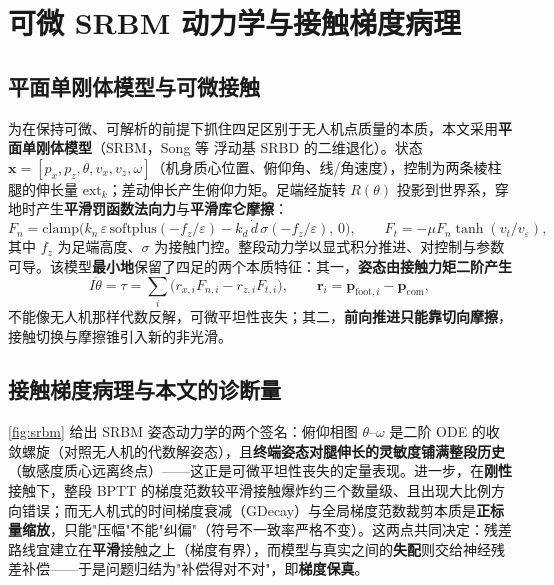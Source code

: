 \documentclass[zihao=5, a4paper]{ctexart}
\begin{document}
\section{可微 SRBM 动力学与接触梯度病理}

\subsection{平面单刚体模型与可微接触}

为在保持可微、可解析的前提下抓住四足区别于无人机点质量的本质，本文采用\textbf{平面单刚体模型}（SRBM，Song 等\cite{ref13} 浮动基 SRBD 的二维退化）。状态 $\bm x=[p_x,p_z,\theta,v_x,v_z,\omega]$（机身质心位置、俯仰角、线/角速度），控制为两条棱柱腿的伸长量 $\mathrm{ext}_k$；差动伸长产生俯仰力矩。足端经旋转 $R(\theta)$ 投影到世界系，穿地时产生\textbf{平滑罚函数法向力}与\textbf{平滑库仑摩擦}：
\begin{equation}
  F_n=\mathrm{clamp}\!\big(k_n\,\varepsilon\,\mathrm{softplus}(-f_z/\varepsilon)-k_d\,\dot d\,\sigma(-f_z/\varepsilon),\,0\big),
  \qquad
  F_t=-\mu F_n\tanh(v_t/v_\varepsilon),
  \label{eq:contact}
\end{equation}
其中 $f_z$ 为足端高度、$\sigma$ 为接触门控。整段动力学以显式积分推进、对控制与参数可导。该模型\textbf{最小地}保留了四足的两个本质特征：其一，\textbf{姿态由接触力矩二阶产生}
\begin{equation}
  I\ddot\theta=\tau=\sum_{i} \big(r_{x,i}F_{n,i}-r_{z,i}F_{t,i}\big),\qquad \bm r_i=\bm p_{\text{foot},i}-\bm p_{\text{com}},
  \label{eq:torque}
\end{equation}
不能像无人机那样代数反解，可微平坦性丧失；其二，\textbf{前向推进只能靠切向摩擦}，接触切换与摩擦锥引入新的非光滑。

\subsection{接触梯度病理与本文的诊断量}

\cref{fig:srbm} 给出 SRBM 姿态动力学的两个签名：俯仰相图 $\theta$--$\omega$ 是二阶 ODE 的收敛螺旋（对照无人机的代数解姿态），且\textbf{终端姿态对腿伸长的灵敏度铺满整段历史}（敏感度质心远离终点）——这正是可微平坦性丧失的定量表现。进一步，在\textbf{刚性}接触下，整段 BPTT 的梯度范数较平滑接触爆炸约三个数量级、且出现大比例方向错误；而无人机式的时间梯度衰减（GDecay）与全局梯度范数裁剪本质是\textbf{正标量缩放}，只能"压幅"不能"纠偏"（符号不一致率严格不变）。这两点共同决定：残差路线宜建立在\textbf{平滑}接触之上（梯度有界），而模型与真实之间的\textbf{失配}则交给神经残差补偿——于是问题归结为"补偿得对不对"，即\textbf{梯度保真}。
\end{document}
